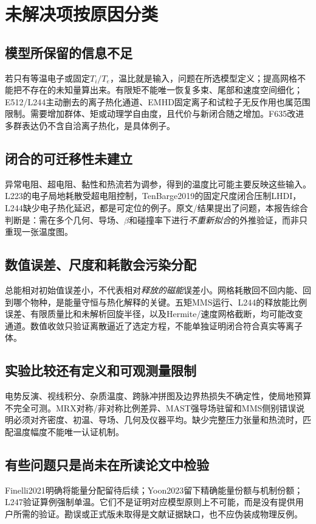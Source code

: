 \documentclass[UTF8,a4paper,11pt,openany,fontset=fandol]{ctexbook}
\begin{document}
\section{未解决项按原因分类}
\subsection{模型所保留的信息不足}
若只有等温电子或固定$T_i/T_e$，温比就是输入，问题在所选模型定义；提高网格不能把不存在的未知量算出来。有限矩不能唯一恢复多束、尾部和速度空间细化；E512/L244主动删去的离子热化通道、EMHD固定离子和试粒子无反作用也属范围限制。需要增加群体、矩或动理学自由度，且代价与新闭合随之增加。F635改进多群表达仍不含自洽离子热化，是具体例子。

\subsection{闭合的可迁移性未建立}
异常电阻、超电阻、黏性和热流若为调参，得到的温度比可能主要反映这些输入。L223的电子局地耗散受超电阻控制，TenBarge2019的固定尺度闭合压制LHDI，L244缺少电子热化延迟，都是可定位的例子。原文/结果提出了问题，本报告综合判断是：需在多个几何、导场、$\beta$和碰撞率下进行\emph{不重新拟合}的外推验证，而非只重现一张温度图。

\subsection{数值误差、尺度和耗散会污染分配}
总能相对初始值误差小，不代表相对\emph{释放的磁能}误差小。网格耗散回不回内能、回到哪个物种，是能量守恒与热化解释的关键。五矩MMS运行、L244的释放能比例误差、有限质量比和未解析回旋半径，以及Hermite/速度网格截断，均可能改变通道。数值收敛只验证离散逼近了选定方程，不能单独证明闭合符合真实等离子体。

\subsection{实验比较还有定义和可观测量限制}
电势反演、视线积分、杂质温度、跨脉冲拼图及边界热损失不确定性，使局地预算不完全可测。MRX对称/非对称比例差异、MAST强导场驻留和MMS侧别错误说明必须对齐密度、初温、导场、几何及仪器平均。缺少完整压力张量和热流时，匹配温度幅度不能唯一认证机制。

\subsection{有些问题只是尚未在所读论文中检验}
Finelli2021明确将能量分配留待后续；Yoon2023留下精确能量份额与机制份额；L247验证算例强制单温。它们不是证明对应模型原则上不可能，而是没有提供用户所需的验证。勘误或正式版未取得是文献证据缺口，也不应伪装成物理反例。
\end{document}
